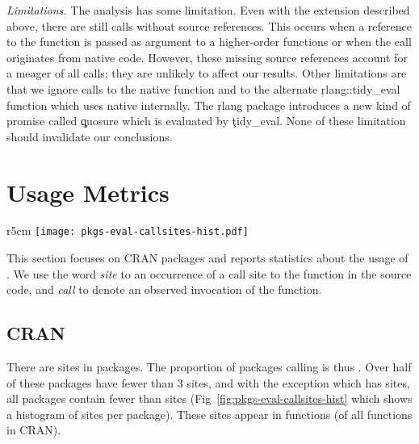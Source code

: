\documentclass[screen,acmsmall]{acmart}
\newcommand{\mypara}[1]{\medskip\noindent\emph{#1}\xspace}
\begin{document}
\mypara{Limitations.} The analysis has some limitation. Even with the extension
described above, there are still \PkgUndefinedRnd \eval calls without source
references. This occurs when a reference to the \eval function is passed as
argument to a higher-order functions or when the \eval call originates from
native code. However, these missing source references account for a meager
\PkgUndefinedRatio of all calls; they are unlikely to affect our results. Other
limitations are that we ignore calls to the native \eval function and to the
alternate \c{rlang::tidy\_eval} function which uses native \eval internally.
The \c{rlang} package introduces a new kind of promise called \c{quosure} which
is evaluated by \c{tidy\_eval}. None of these limitation should invalidate our
conclusions.

\newpage

\section{Usage Metrics}

\begin{wrapfigure}{r}{5cm} \hspace*{-12mm}
  \centering
  \texttt{[image: pkgs-eval-callsites-hist.pdf]} \caption{CRAN
  \eval call sites}%
  \label{fig:pkgs-eval-callsites-hist}
\end{wrapfigure}
%
This section focuses on CRAN packages and reports statistics about the usage of
\eval. We use the word \emph{site} to an occurrence of a call site to the \eval
function in the source code, and \emph{call} to denote an observed invocation of
the \eval function.

\subsection{CRAN}

There are \PkgEvalCallSites \eval sites in \PkgPackages packages. The proportion
of packages calling \eval is thus \PkgPackagesRatio. Over half of these packages
have fewer than 3 sites, and with the exception \MaxEvalCallSitesPackage which
has \MaxEvalCallSitesCount sites, all packages contain fewer than
\MaxEvalCallSitesRest sites (\cf Fig~\ref{fig:pkgs-eval-callsites-hist} which
shows a histogram of sites per package). These sites appear in \PkgFunsWithEval
functions (\CranFunsWithEvalRatio of all functions in CRAN).
\end{document}
